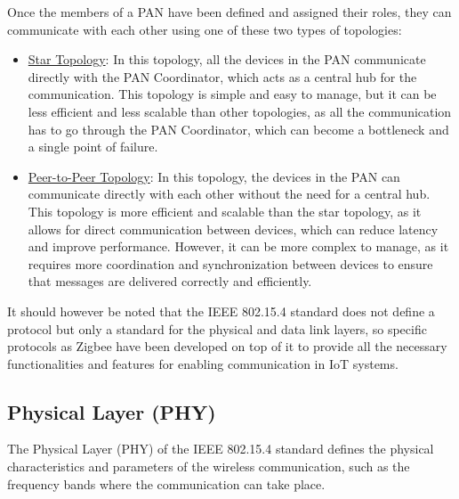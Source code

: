 Once the members of a PAN have been defined and assigned their roles, they can communicate with each other using one of these two types of topologies:
\begin{itemize}
    \item \ul{Star Topology}: In this topology, all the devices in the PAN communicate directly with the PAN Coordinator, which acts as a central hub for the communication. This topology is simple and easy to manage, but it can be less efficient and less scalable than other topologies, as all the communication has to go through the PAN Coordinator, which can become a bottleneck and a single point of failure.
    \item \ul{Peer-to-Peer Topology}: In this topology, the devices in the PAN can communicate directly with each other without the need for a central hub. This topology is more efficient and scalable than the star topology, as it allows for direct communication between devices, which can reduce latency and improve performance. However, it can be more complex to manage, as it requires more coordination and synchronization between devices to ensure that messages are delivered correctly and efficiently.
\end{itemize}

It should however be noted that the IEEE 802.15.4 standard does not define a protocol but only a standard for the physical and data link layers, so specific protocols as Zigbee have been developed on top of it to provide all the necessary functionalities and features for enabling communication in IoT systems.

\subsection{Physical Layer (PHY)}

The Physical Layer (PHY) of the IEEE 802.15.4 standard defines the physical characteristics and parameters of the wireless communication, such as the frequency bands where the communication can take place.

